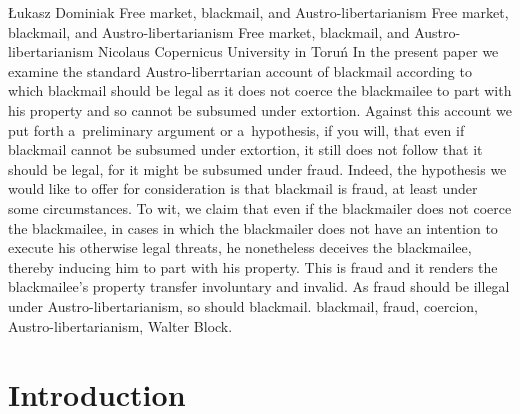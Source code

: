\begin{artengenv}{Łukasz Dominiak}
	{Free market, blackmail, and Austro-libertarianism}
	{Free market, blackmail, and Austro-libertarianism}
	{Free market, blackmail, and Austro-libertarianism}
	{Nicolaus Copernicus University in Toruń}
	{In the present paper we examine the standard Austro-liberrtarian account of blackmail according to which blackmail should be legal as it does not coerce the blackmailee to part with his property and so cannot be subsumed under extortion. Against this account we put forth a~preliminary argument or a~hypothesis, if you will, that even if blackmail cannot be subsumed under extortion, it still does not follow that it should be legal, for it might be subsumed under fraud. Indeed, the hypothesis we would like to offer for consideration is that blackmail is fraud, at least under some circumstances. To wit, we claim that even if the blackmailer does not coerce the blackmailee, in cases in which the blackmailer does not have an intention to execute his otherwise legal threats, he nonetheless deceives the blackmailee, thereby inducing him to part with his property. This is fraud and it renders the blackmailee's property transfer involuntary and invalid. As fraud should be illegal under Austro-libertarianism, so should blackmail.
	}
	{blackmail, fraud, coercion, Austro-libertarianism, Walter Block.}






\section{Introduction}


\end{artengenv}
